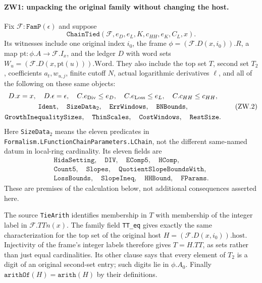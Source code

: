 \paragraph{ZW1: unpacking the original family without changing the host.}
\label{claim:ZW1}
Fix $\mathcal F:\texttt{FamP}(\epsilon)$ and suppose
\[
 \texttt{ChainTied}(\mathcal F,e_D,e_L,K,c_{HH},e_K,C_L,x).
 \tag{ZW.1}
\]
Its witnesses include one original index $i_0$, the frame
$\phi=(\mathcal F.D(x,i_0)).R$, a map
$\mathrm{pt}:\phi.A\to\mathcal F.I_x$, and the ledger $D$ with word
sets $W_u=(\mathcal F.D(x,\mathrm{pt}(u))).\mathrm{Word}$.
They also include the top set $T$, second set $T_2$, coefficients
$a_t,w_{u,j}$, finite cutoff $N$, actual logarithmic derivatives
$\ell$, and all of the following on these same objects:
\[
 \begin{gathered}
 D.x=x,\quad D.\epsilon=\epsilon,\quad
 C.e_{\rm Div}\le e_D,\quad C.e_{\rm Loss}\le e_L,
 \quad C.c_{HH}\le c_{HH},\\
 \texttt{Ident},\quad \texttt{SizeData}_2,\quad
 \texttt{ErrWindows},\quad\texttt{BNBounds},\\
 \texttt{GrowthInequalitySizes},\quad\texttt{ThinScales},\quad
 \texttt{CostWindows},\quad\texttt{RestSize}.
 \end{gathered}                                                    \tag{ZW.2}
\]
Here \texttt{SizeData}$_2$ means the eleven predicates in
\texttt{Formalism.LFunctionChainParameters.LChain}, not the different
same-named datum in local-ring cardinality.  Its eleven fields are
\[
 \begin{gathered}
 \texttt{HidaSetting},\quad \texttt{DIV},\quad
 \texttt{EComp5},\quad \texttt{HComp},\\
 \texttt{Count5},\quad \texttt{Slopes},\quad
 \texttt{QuotientSlopeBoundsWith},\\
 \texttt{LossBounds},\quad \texttt{SlopeIneq},\quad
 \texttt{HHBound},\quad \texttt{FParams}.
 \end{gathered}
\]
These are premises of the calculation below, not additional consequences
asserted here.

The source \texttt{TieArith} identifies membership in $T$ with membership
of the integer label in $\mathcal F.TTn(x)$.  The family field
\texttt{TT\_eq} gives exactly the same characterization for the top set
of the original host $H=(\mathcal F.D(x,i_0)).\mathrm{host}$.
Injectivity of the frame's integer labels therefore gives
$T=H.TT$, as sets rather than just equal cardinalities.  Its other
clause says that every element of $T_2$ is a digit of an original
second-set entry; such digits lie in $\phi.A_0$.  Finally
$\texttt{arithOf}(H)=\texttt{arith}(H)$ by their definitions.

